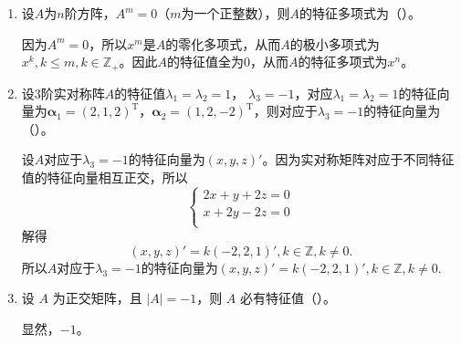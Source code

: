 \begin{enumerate}[1~]
\begin{enumerate}[1.~]
\item
设$A$为$n$阶方阵，$A^m=0$（$m$为一个正整数），则$A$的特征多项式为（\quad）。
\begin{solution}
因为$A^m=0$，所以$x^m$是$A$的零化多项式，从而$A$的极小多项式为$x^k, k\le m, k\in \mathbb{Z}_+$。因此$A$的特征值全为0，从而$A$的特征多项式为$x^n$。
\end{solution}

\item
设3阶实对称阵$A$的特征值$\lambda _ { 1 } = \lambda _ { 2 } = 1$， $\lambda _ { 3 } = - 1$，对应$\lambda _ { 1 } = \lambda _ { 2 } = 1$的特征向量为$\boldsymbol{\alpha} _ { 1 } = ( 2,1,2 ) ^ { \mathrm { T } }$，$\boldsymbol{\alpha} _ { 2 } = ( 1,2 , - 2 ) ^ { \mathrm { T } }$，则对应于$\lambda_3=-1$的特征向量为（\quad）。
\begin{solution}
设$A$对应于$\lambda_3=-1$的特征向量为$(x, y, z)'$。因为实对称矩阵对应于不同特征值的特征向量相互正交，所以\[
\left\{ \begin{array}{l}
	2x+y+2z=0\\
	x+2y-2z=0\\
\end{array} \right. 
\]
解得\[
(x, y, z)'=k(-2, 2, 1)', k\in\mathbb{Z}, k\ne 0.
\]
所以$A$对应于$\lambda_3=-1$的特征向量为$(x, y, z)'=k(-2, 2, 1)', k\in\mathbb{Z}, k\ne 0.$
\end{solution}

\item
设 $A$ 为正交矩阵，且 $|A|=-1$，则 $A$ 必有特征值（\quad）。
\begin{solution}
显然，$-1$。
\end{solution}
\end{enumerate}


\end{enumerate}
